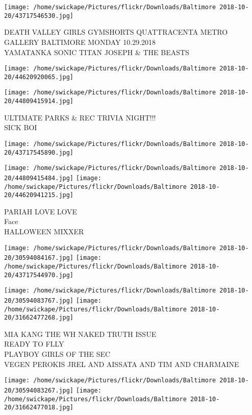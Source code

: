 \documentclass[10pt,letterpaper]{article}
\begin{document}
\vspace{0.25in}
\texttt{[image: /home/swickape/Pictures/flickr/Downloads/Baltimore 2018-10-20/43717546530.jpg]}

DEATH VALLEY GIRLS GYMSHORTS QUATTRACENTA METRO GALLERY BALTIMORE MONDAY 10.29.2018\\
YAMATANKA SONIC TITAN JOSEPH \& THE BEASTS
\pagebreak

\texttt{[image: /home/swickape/Pictures/flickr/Downloads/Baltimore 2018-10-20/44620920065.jpg]}

\vspace{0.25in}
\texttt{[image: /home/swickape/Pictures/flickr/Downloads/Baltimore 2018-10-20/44809415914.jpg]}

ULTIMATE PARKS \& REC TRIVIA NIGHT!!!\\
SICK BOI
\pagebreak

\texttt{[image: /home/swickape/Pictures/flickr/Downloads/Baltimore 2018-10-20/43717545890.jpg]}

\vspace{0.25in}
\texttt{[image: /home/swickape/Pictures/flickr/Downloads/Baltimore 2018-10-20/44809415484.jpg]}
\texttt{[image: /home/swickape/Pictures/flickr/Downloads/Baltimore 2018-10-20/44620941215.jpg]}

PARIAH LOVE LOVE\\
Face\\
HALLOWEEN MIXXER
\pagebreak

\texttt{[image: /home/swickape/Pictures/flickr/Downloads/Baltimore 2018-10-20/30594084167.jpg]}
\texttt{[image: /home/swickape/Pictures/flickr/Downloads/Baltimore 2018-10-20/43717544970.jpg]}

\texttt{[image: /home/swickape/Pictures/flickr/Downloads/Baltimore 2018-10-20/30594083767.jpg]}
\texttt{[image: /home/swickape/Pictures/flickr/Downloads/Baltimore 2018-10-20/31662477268.jpg]}

MIA KANG THE WH NAKED TRUTH ISSUE\\
READY TO FLLY\\
PLAYBOY GIRLS OF THE SEC\\
VEGEN PEROKIS JREL AND AISSATA AND TIM AND CHARMAINE
\pagebreak

\texttt{[image: /home/swickape/Pictures/flickr/Downloads/Baltimore 2018-10-20/30594083267.jpg]}
\texttt{[image: /home/swickape/Pictures/flickr/Downloads/Baltimore 2018-10-20/31662477018.jpg]}
\end{document}
